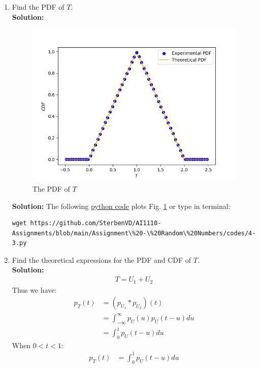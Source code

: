 \documentclass[journal,12pt,onecolumn]{IEEEtran}
\numberwithin{equation}{section}
\renewcommand\thesection{\arabic{section}}
\providecommand{\gitlink}[2]{{\color{blue}\href{https://github.com/SterbenVD/AI1110-Assignments/blob/main/Assignment\%20-\%20Random\%20Numbers/#1}{#2}}}
\newcommand{\solution}{\noindent \textbf{Solution: }}
\begin{document}
\begin{enumerate}[label=\thesection.\arabic*
        ,ref=\thesection.\theenumi]
    \item Find the PDF of $T$.
          \\
          \solution\begin{figure}[H]
              \centering
              \includegraphics[scale = 0.9]{../figs/4_pdf}
              \caption{The PDF of $T$}
              \label{fig:4_pdf}
          \end{figure}
          \solution The following \gitlink{codes/4-3.py}{python code} plots Fig. \ref{fig:4_pdf} or type in terminal:
          \begin{lstlisting}
wget https://github.com/SterbenVD/AI1110-Assignments/blob/main/Assignment\%20-\%20Random\%20Numbers/codes/4-3.py
      \end{lstlisting}
    \item Find the theoretical expressions for the PDF and CDF of $T$. \\
          \solution
          \begin{align}
              T = U_1 + U_2
          \end{align}
          Thus we have:
          \begin{align}
              p_T(t) & = (p_{U_1} * p_{U_2})(t)
              \\
                     & = \int _{-\infty} ^{\infty} p_U(u) p_U(t-u) du
              \\
                     & = \int _0 ^1 p_U(t-u) du
          \end{align}
          When $0 < t < 1$:
          \begin{align}
              p_T(t) & = \int _0 ^1 p_U(t-u) du

\end{align}
\end{enumerate}
\end{document}
